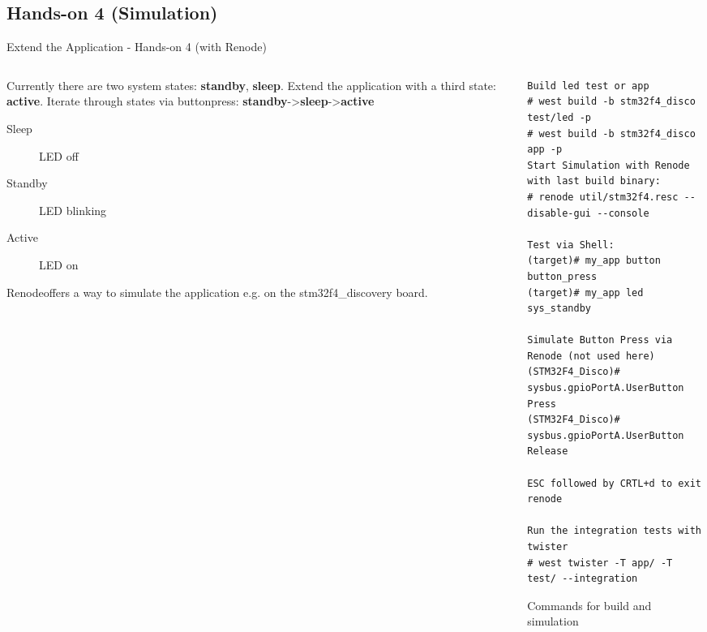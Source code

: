 \documentclass[10pt, aspectratio=169]{beamer}
\begin{document}
\subsection*{Hands-on 4 (Simulation)}
\begin{frame}[fragile]{Extend the Application - Hands-on 4 (with Renode)}
  \begin{columns}
    \begin{column}{0.6\textwidth}
      Currently there are two system states: \textbf{standby}, \textbf{sleep}.
      Extend the application with a third state: \textbf{active}. Iterate
      through states via buttonpress:
      \textbf{standby}->\textbf{sleep}->\textbf{active}\footnotemark
      \begin{description}
        \item [Sleep] LED off
        \item [Standby] LED blinking
        \item [Active] LED on
      \end{description}
	    Renode\footnotemark offers a way to simulate the application e.g. on the stm32f4\_discovery board.
    \end{column}
    \begin{column}{0.4\textwidth}
      \begin{listing}[H]
        \begin{verbatim}
Build led test or app
# west build -b stm32f4_disco test/led -p
# west build -b stm32f4_disco app -p
Start Simulation with Renode with last build binary:
# renode util/stm32f4.resc --disable-gui --console

Test via Shell:
(target)# my_app button button_press
(target)# my_app led sys_standby

Simulate Button Press via Renode (not used here)
(STM32F4_Disco)# sysbus.gpioPortA.UserButton Press
(STM32F4_Disco)# sysbus.gpioPortA.UserButton Release

ESC followed by CRTL+d to exit renode

Run the integration tests with twister
# west twister -T app/ -T test/ --integration
        \end{verbatim}
        \caption{\footnotesize{Commands for build and simulation}}
      \end{listing}
    \end{column}
  \end{columns}
\end{frame}
\end{document}
